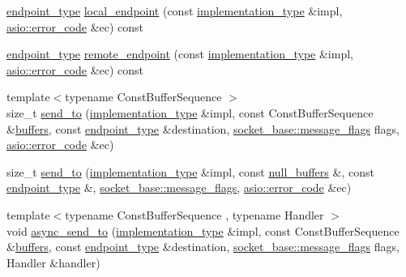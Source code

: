 \begin{DoxyCompactItemize}
\item 
\hyperlink{classasio_1_1detail_1_1reactive__socket__service_adad302be53c8a4ea6e7693bc88595381}{endpoint\+\_\+type} \hyperlink{classasio_1_1detail_1_1reactive__socket__service_aae35c7597863b44d1d5f0ae8f9894d50}{local\+\_\+endpoint} (const \hyperlink{structasio_1_1detail_1_1reactive__socket__service_1_1implementation__type}{implementation\+\_\+type} \&impl, \hyperlink{classasio_1_1error__code}{asio\+::error\+\_\+code} \&ec) const 
\item 
\hyperlink{classasio_1_1detail_1_1reactive__socket__service_adad302be53c8a4ea6e7693bc88595381}{endpoint\+\_\+type} \hyperlink{classasio_1_1detail_1_1reactive__socket__service_af29c839e6278ab7aa9215b5c663a46d9}{remote\+\_\+endpoint} (const \hyperlink{structasio_1_1detail_1_1reactive__socket__service_1_1implementation__type}{implementation\+\_\+type} \&impl, \hyperlink{classasio_1_1error__code}{asio\+::error\+\_\+code} \&ec) const 
\item 
{\footnotesize template$<$typename Const\+Buffer\+Sequence $>$ }\\size\+\_\+t \hyperlink{classasio_1_1detail_1_1reactive__socket__service_a9b484fac305607a9bf0812322f061d56}{send\+\_\+to} (\hyperlink{structasio_1_1detail_1_1reactive__socket__service_1_1implementation__type}{implementation\+\_\+type} \&impl, const Const\+Buffer\+Sequence \&\hyperlink{group__async__read_ga54dede45c3175148a77fe6635222c47d}{buffers}, const \hyperlink{classasio_1_1detail_1_1reactive__socket__service_adad302be53c8a4ea6e7693bc88595381}{endpoint\+\_\+type} \&destination, \hyperlink{classasio_1_1socket__base_ac3cf77465dfedfe1979b5415cf32cc94}{socket\+\_\+base\+::message\+\_\+flags} flags, \hyperlink{classasio_1_1error__code}{asio\+::error\+\_\+code} \&ec)
\item 
size\+\_\+t \hyperlink{classasio_1_1detail_1_1reactive__socket__service_a4cd8ffb44bd6aba0ea90ebfc8c72b2d9}{send\+\_\+to} (\hyperlink{structasio_1_1detail_1_1reactive__socket__service_1_1implementation__type}{implementation\+\_\+type} \&impl, const \hyperlink{classasio_1_1null__buffers}{null\+\_\+buffers} \&, const \hyperlink{classasio_1_1detail_1_1reactive__socket__service_adad302be53c8a4ea6e7693bc88595381}{endpoint\+\_\+type} \&, \hyperlink{classasio_1_1socket__base_ac3cf77465dfedfe1979b5415cf32cc94}{socket\+\_\+base\+::message\+\_\+flags}, \hyperlink{classasio_1_1error__code}{asio\+::error\+\_\+code} \&ec)
\item 
{\footnotesize template$<$typename Const\+Buffer\+Sequence , typename Handler $>$ }\\void \hyperlink{classasio_1_1detail_1_1reactive__socket__service_af38165dc7698347d8b5781b04d766e2c}{async\+\_\+send\+\_\+to} (\hyperlink{structasio_1_1detail_1_1reactive__socket__service_1_1implementation__type}{implementation\+\_\+type} \&impl, const Const\+Buffer\+Sequence \&\hyperlink{group__async__read_ga54dede45c3175148a77fe6635222c47d}{buffers}, const \hyperlink{classasio_1_1detail_1_1reactive__socket__service_adad302be53c8a4ea6e7693bc88595381}{endpoint\+\_\+type} \&destination, \hyperlink{classasio_1_1socket__base_ac3cf77465dfedfe1979b5415cf32cc94}{socket\+\_\+base\+::message\+\_\+flags} flags, Handler \&handler)

\end{DoxyCompactItemize}
